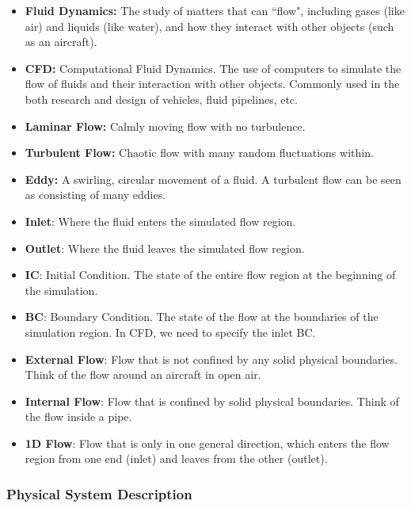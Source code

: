 \documentclass[12pt]{article}
\begin{document}
\begin{itemize}
  \item \textbf{Fluid Dynamics:} The study of matters that can ``flow", including gases (like air) and liquids (like water), and how they interact with other objects (such as an aircraft).
  \item \textbf{CFD:} Computational Fluid Dynamics. The use of computers to simulate the flow of fluids and their interaction with other objects. Commonly used in the both research and design of vehicles, fluid pipelines, etc.
  \item \textbf{Laminar Flow:} Calmly moving flow with no turbulence.
  \item \textbf{Turbulent Flow:} Chaotic flow with many random fluctuations within.
  \item \textbf{Eddy:} A swirling, circular movement of a fluid. A turbulent flow can be seen as consisting of many eddies.
  \item \textbf{Inlet}: Where the fluid enters the simulated flow region.
  \item \textbf{Outlet}: Where the fluid leaves the simulated flow region.
  \item \textbf{IC}: Initial Condition. The state of the entire flow region at the beginning of the simulation.
  \item \textbf{BC}: Boundary Condition. The state of the flow at the boundaries of the simulation region. In CFD, we need to specify the inlet BC. 
  \item \textbf{External Flow}: Flow that is not confined by any solid physical boundaries. Think of the flow around an aircraft in open air.
  \item \textbf{Internal Flow}: Flow that is confined by solid physical boundaries. Think of the flow inside a pipe.
  \item \textbf{1D Flow}: Flow that is only in one general direction, which enters the flow region from one end (inlet) and leaves from the other (outlet).
  \end{itemize}

\subsubsection{Physical System Description} \label{sec_phySystDescrip}
\end{document}

